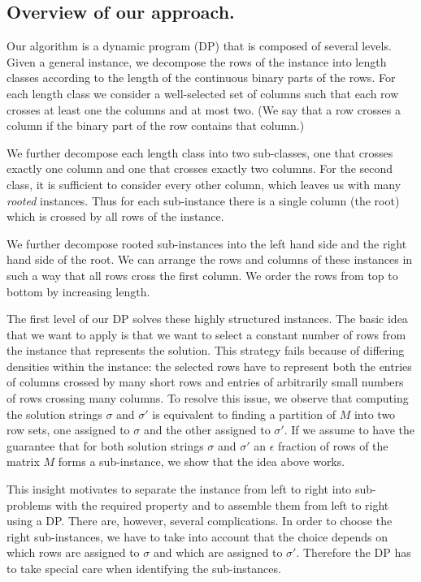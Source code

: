 \subsection{Overview of our approach.}

Our algorithm is a dynamic program (DP) that is composed of several levels.
Given a general \GMEC instance, we decompose the rows of the instance into length classes according to the length of the continuous binary parts of the rows.
For each length class we consider a well-selected set of columns such that each row crosses at least one the columns and at most two.
(We say that a row crosses a column if the binary part of the row contains that column.)

We further decompose each length class into two sub-classes, one that crosses exactly one column and one that crosses exactly two columns.
For the second class, it is sufficient to consider every other column, which leaves us with many \emph{rooted} instances.
Thus for each sub-instance there is a single column (the root) which is crossed by all rows of the instance.

We further decompose rooted sub-instances into the left hand side and the right hand side of the root.
We can arrange the rows and columns of these instances in such a way that all rows cross the first column.
We order the rows from top to bottom by increasing length.

The first level of our DP solves these highly structured instances.
The basic idea that we want to apply is that we want to select a constant number of rows from the instance that represents the solution.
This strategy fails because of differing densities within the instance: the selected rows have to represent both the entries of columns crossed by many short rows and entries of arbitrarily small numbers of rows crossing many columns.
To resolve this issue, we observe that computing the solution strings $\sigma$ and $\sigma'$ is equivalent to finding a partition of $M$ into two row sets, one assigned to $\sigma$ and the other assigned to $\sigma'$.
If we assume to have the guarantee that for both solution strings $\sigma$ and $\sigma'$ an $\epsilon$ fraction of rows of the matrix $M$ forms a \BMEC sub-instance, we show that the idea above works.

This insight motivates to separate the instance from left to right into sub-problems with the required property and to assemble them from left to right using a DP.
There are, however, several complications.
In order to choose the right sub-instances, we have to take into account that the choice depends on which rows are assigned to $\sigma$ and which are assigned to $\sigma'$.
Therefore the DP has to take special care when identifying the sub-instances.

